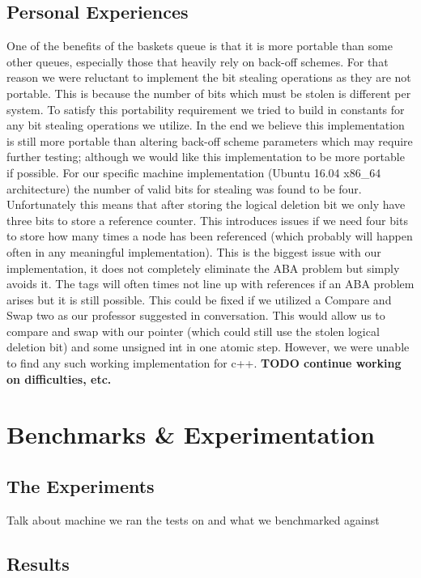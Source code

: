 \documentclass[conference]{IEEEtran}
\begin{document}
\subsection{Personal Experiences}
One of the benefits of the baskets queue is that it is more portable than some other queues, especially those that heavily rely on back-off schemes.  For that reason we were reluctant to implement the bit stealing operations as they are not portable.  This is because the number of bits which must be stolen is different per system.  To satisfy this portability requirement we tried to build in constants for any bit stealing operations we utilize.  In the end we believe this implementation is still more portable than altering back-off scheme parameters which may require further testing; although we would like this implementation to be more portable if possible.  For our specific machine implementation (Ubuntu 16.04 x86\_64 architecture) the number of valid bits for stealing was found to be four.  Unfortunately this means that after storing the logical deletion bit we only have three bits to store a reference counter.  This introduces issues if we need four bits to store how many times a node has been referenced (which probably will happen often in any meaningful implementation).  This is the biggest issue with our implementation, it does not completely eliminate the ABA problem but simply avoids it.  The tags will often times not line up with references if an ABA problem arises but it is still possible.  This could be fixed if we utilized a Compare and Swap two as our professor suggested in conversation.  This would allow us to compare and swap with our pointer (which could still use the stolen logical deletion bit) and some unsigned int in one atomic step.  However, we were unable to find any such working implementation for c++.
\textbf{TODO continue working on difficulties, etc.}
\section{Benchmarks \& Experimentation}
\subsection{The Experiments}
Talk about machine we ran the tests on and what we benchmarked against
\subsection{Results}
\end{document}
